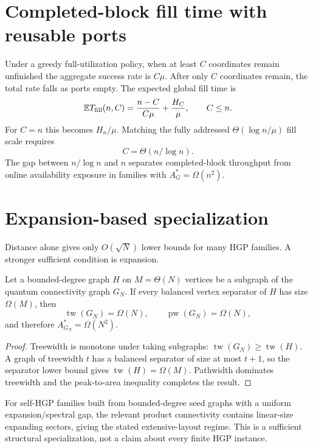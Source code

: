\documentclass[aps,prx,preprint,superscriptaddress,nofootinbib,longbibliography]{revtex4-2}
\newcommand{\E}{\mathbb E}\newcommand{\Prob}{\mathbb P}\newcommand{\pw}{\operatorname{pw}}\newcommand{\tw}{\operatorname{tw}}
\begin{document}
\section{Completed-block fill time with reusable ports}
Under a greedy full-utilization policy, when at least $C$ coordinates remain unfinished the aggregate success rate is $C\mu$. After only $C$ coordinates remain, the total rate falls as ports empty. The expected global fill time is
\begin{equation}
\E T_{\rm fill}(n,C)=\frac{n-C}{C\mu}+\frac{H_C}{\mu},\qquad C\le n.
\end{equation}
For $C=n$ this becomes $H_n/\mu$. Matching the fully addressed $\Theta(\log n/\mu)$ fill scale requires
\begin{equation}
C=\Theta(n/\log n).
\end{equation}
The gap between $n/\log n$ and $n$ separates completed-block throughput from online availability exposure in families with $A_G^*=\Omega(n^2)$.

\section{Expansion-based specialization}
Distance alone gives only $O(\sqrt N)$ lower bounds for many HGP families. A stronger sufficient condition is expansion.

\begin{proposition}
Let a bounded-degree graph $H$ on $M=\Theta(N)$ vertices be a subgraph of the quantum connectivity graph $G_N$. If every balanced vertex separator of $H$ has size $\Omega(M)$, then
\begin{equation}
\tw(G_N)=\Omega(N),\qquad\pw(G_N)=\Omega(N),
\end{equation}
and therefore $A_{G_N}^*=\Omega(N^2)$.
\end{proposition}
\begin{proof}
Treewidth is monotone under taking subgraphs: $\tw(G_N)\ge\tw(H)$. A graph of treewidth $t$ has a balanced separator of size at most $t+1$, so the separator lower bound gives $\tw(H)=\Omega(M)$. Pathwidth dominates treewidth and the peak-to-area inequality completes the result.
\end{proof}
For self-HGP families built from bounded-degree seed graphs with a uniform expansion/spectral gap, the relevant product connectivity contains linear-size expanding sectors, giving the stated extensive-layout regime. This is a sufficient structural specialization, not a claim about every finite HGP instance.
\end{document}
